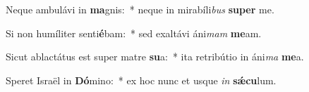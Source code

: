 \item Neque ambulávi in \textbf{ma}gnis:~* neque in mirabíli\textit{bus} \textbf{su}\textbf{per} me.
\item Si non humíliter senti\textbf{é}bam:~* sed exaltávi áni\textit{mam} \textbf{me}am.
\item Sicut ablactátus est super matre \textbf{su}a:~* ita retribútio in áni\textit{ma} \textbf{me}a.
\item Speret Israël in \textbf{Dó}mino:~* ex hoc nunc et usque \textit{in} \textbf{sǽ}\textbf{cu}lum.
